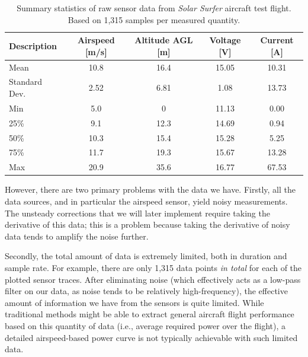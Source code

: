 \documentclass[conf]{new-aiaa}
\begin{document}
    \begin{table}[H]
        \centering
        \caption{Summary statistics of raw sensor data from \emph{Solar Surfer} aircraft test flight. Based on 1,315 samples per measured quantity.}
        \begin{tabular}{lcccc}
            \toprule
            Description   & Airspeed [m/s] & Altitude AGL [m] & Voltage [V] & Current [A] \\ \midrule
            Mean          & 10.8           & 16.4             & 15.05       & 10.31       \\
            Standard Dev. & 2.52           & 6.81             & 1.08        & 13.73       \\
            Min           & 5.0            & 0                & 11.13       & 0.00        \\
            25\%          & 9.1            & 12.3             & 14.69       & 0.94        \\
            50\%          & 10.3           & 15.4             & 15.28       & 5.25        \\
            75\%          & 11.7           & 19.3             & 15.67       & 13.28       \\
            Max           & 20.9           & 35.6             & 16.77       & 67.53       \\ \bottomrule
        \end{tabular}
        \label{tab:aircraft_stats}
    \end{table}

    However, there are two primary problems with the data we have. Firstly, all the data sources, and in particular the airspeed sensor, yield noisy measurements. The unsteady corrections that we will later implement require taking the derivative of this data; this is a problem because taking the derivative of noisy data tends to amplify the noise further.

    Secondly, the total amount of data is extremely limited, both in duration and sample rate. For example, there are only 1,315 data points \emph{in total} for each of the plotted sensor traces. After eliminating noise (which effectively acts as a low-pass filter on our data, as noise tends to be relatively high-frequency), the effective amount of information we have from the sensors is quite limited. While traditional methods might be able to extract general aircraft flight performance based on this quantity of data (i.e., average required power over the flight), a detailed airspeed-based power curve is not typically achievable with such limited data.
\end{document}
